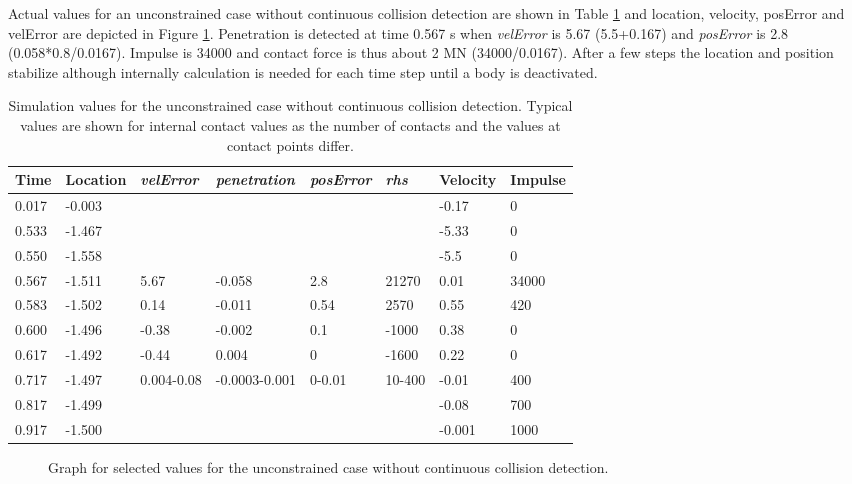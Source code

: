 Actual values for an unconstrained case without continuous collision detection
are shown in Table \ref{tab:freeBlockValues} and 
location, velocity, posError and velError are depicted in Figure \ref{fig:uc}. 
Penetration is detected at time 0.567 s when
{\it velError} is 5.67 (5.5+0.167) and
{\it posError} is 2.8 (0.058*0.8/0.0167). Impulse is 34000 and contact force is thus about 2 MN (34000/0.0167).
After a few steps the location and position stabilize although internally calculation is needed for each time step
until a body is deactivated.

\begin {table}[htb!]
\caption {Simulation values for the unconstrained case without continuous collision detection. 
Typical values are shown for internal contact values
as the number of contacts and the values at contact points differ.} 
\label{tab:freeBlockValues} 
\begin{center}
\begin{tabular}{|l| l|l| l|l|l|l|l|}
\hline
{\bf Time} & 
{\bf Location} &
{\it velError} & {\it penetration} & {\it posError} & {\it rhs} &
{\bf Velocity} & 
{\bf Impulse} \\  \hline
0.017 &  -0.003 & & & &  &-0.17 & 0 \\  \hline
0.533 &  -1.467 & & & & & -5.33 & 0 \\  \hline
0.550 &  -1.558 & & & & & -5.5 & 0 \\  \hline
0.567 &  -1.511 & 5.67 &-0.058 &2.8 &  21270 & 0.01 & 34000 \\  \hline
0.583 &  -1.502 & 0.14 &-0.011 & 0.54& 2570  & 0.55 & 420 \\  \hline
0.600 &  -1.496 & -0.38&-0.002 & 0.1  & -1000& 0.38 & 0 \\  \hline
0.617 &  -1.492 &-0.44 & 0.004 & 0     & -1600& 0.22 & 0 \\  \hline
0.717 &  -1.497 &0.004-0.08  &-0.0003-0.001 &0-0.01 & 10-400 & -0.01 & 400 \\  \hline
0.817 &  -1.499 & & & & & -0.08 & 700 \\  \hline
0.917 &  -1.500 & & & & & -0.001 & 1000 \\  \hline
\end {tabular}
\end{center}
\end {table}


\begin{figure}[htb!]
\centering

\caption{Graph for selected values for the unconstrained case without continuous collision detection.}
\label{fig:uc}
\end{figure}


